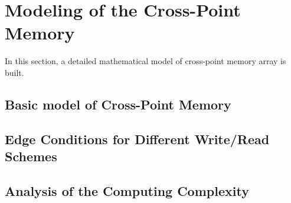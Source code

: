 \vspace{10pt}
\section{Modeling of the Cross-Point Memory}\label{sec:model}
In this section, a detailed mathematical model of cross-point memory array is built.

\subsection{Basic model of Cross-Point Memory}

\subsection{Edge Conditions for Different Write/Read Schemes}

\subsection{Analysis of the Computing Complexity}
